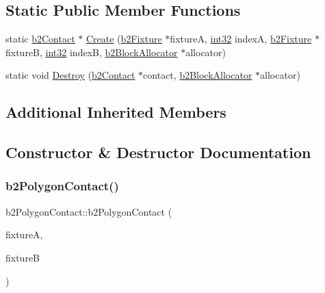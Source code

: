 \subsection*{Static Public Member Functions}
\begin{DoxyCompactItemize}
\item 
static \mbox{\hyperlink{classb2_contact}{b2\+Contact}} $\ast$ \mbox{\hyperlink{classb2_polygon_contact_a65356af432d877838e14755c5eb3c553}{Create}} (\mbox{\hyperlink{classb2_fixture}{b2\+Fixture}} $\ast$fixtureA, \mbox{\hyperlink{b2_settings_8h_a43d43196463bde49cb067f5c20ab8481}{int32}} indexA, \mbox{\hyperlink{classb2_fixture}{b2\+Fixture}} $\ast$fixtureB, \mbox{\hyperlink{b2_settings_8h_a43d43196463bde49cb067f5c20ab8481}{int32}} indexB, \mbox{\hyperlink{classb2_block_allocator}{b2\+Block\+Allocator}} $\ast$allocator)
\item 
static void \mbox{\hyperlink{classb2_polygon_contact_a0cb55fd6af6f49d36c3cda15ffd96e63}{Destroy}} (\mbox{\hyperlink{classb2_contact}{b2\+Contact}} $\ast$contact, \mbox{\hyperlink{classb2_block_allocator}{b2\+Block\+Allocator}} $\ast$allocator)
\end{DoxyCompactItemize}
\subsection*{Additional Inherited Members}


\subsection{Constructor \& Destructor Documentation}
\mbox{\label{classb2_polygon_contact_a93cabf086e75ae40dcd1881760c71c63}} 
\subsubsection{\texorpdfstring{b2PolygonContact()}{b2PolygonContact()}}
{\footnotesize\ttfamily b2\+Polygon\+Contact\+::b2\+Polygon\+Contact (\begin{DoxyParamCaption}\item[{\mbox{\hyperlink{classb2_fixture}{b2\+Fixture}} $\ast$}]{fixtureA,  }\item[{\mbox{\hyperlink{classb2_fixture}{b2\+Fixture}} $\ast$}]{fixtureB }\end{DoxyParamCaption})}

